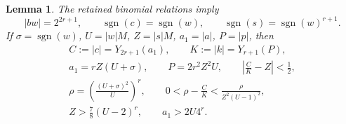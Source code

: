 \documentclass[11pt]{article}
\newtheorem{lemma}[theorem]{Lemma}
\begin{document}
\begin{lemma}\label{signed-binomial}
The retained binomial relations imply
\[
 |bw|=2^{2r+1},\qquad
 \operatorname{sgn}(c)=\operatorname{sgn}(w),\qquad
 \operatorname{sgn}(s)=\operatorname{sgn}(w)^{r+1}.
\]
If \(\sigma=\operatorname{sgn}(w)\), \(U=|w|M\),
\(Z=|s|M\), \(a_1=|a|\), \(P=|p|\), then
\begin{gather}
 C:=|c|=Y_{2r+1}(a_1),\qquad K:=|k|=Y_{r+1}(P),\label{values}\\
 a_1=rZ(U+\sigma),\qquad P=2r^2Z^2U,\qquad
 \left|\frac CK-Z\right|<\frac12,\label{magnitudes}\\
 \rho=\left(\frac{(U+\sigma)^2}{U}\right)^r,\qquad
 0<\rho-\frac CK<\frac{\rho}{Z^2(U-1)^2},\label{ratio}\\
 Z>\frac78(U-2)^r,\qquad a_1>2U4^r.\label{rough-growth}
\end{gather}
\end{lemma}
\end{document}

